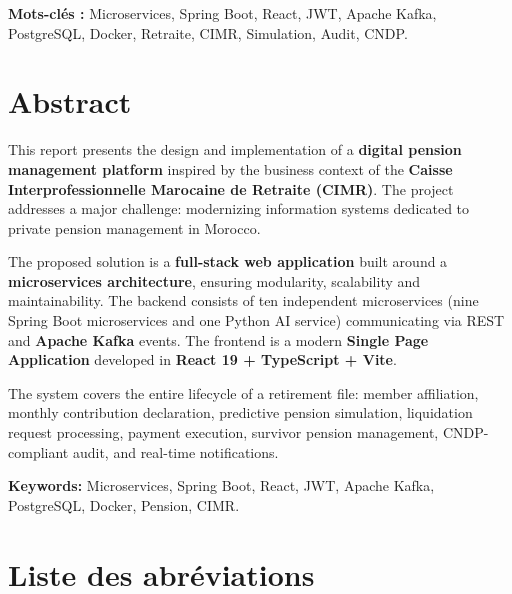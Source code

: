 \documentclass[12pt,a4paper,oneside]{report}
\begin{document}
\textbf{Mots-clés :} Microservices, Spring Boot, React, JWT, Apache Kafka, PostgreSQL, Docker, Retraite, CIMR, Simulation, Audit, CNDP.

\chapter*{Abstract}

This report presents the design and implementation of a \textbf{digital pension management platform} inspired by the business context of the \textbf{Caisse Interprofessionnelle Marocaine de Retraite (CIMR)}. The project addresses a major challenge: modernizing information systems dedicated to private pension management in Morocco.

The proposed solution is a \textbf{full-stack web application} built around a \textbf{microservices architecture}, ensuring modularity, scalability and maintainability. The backend consists of ten independent microservices (nine Spring Boot microservices and one Python AI service) communicating via REST and \textbf{Apache Kafka} events. The frontend is a modern \textbf{Single Page Application} developed in \textbf{React 19 + TypeScript + Vite}.

The system covers the entire lifecycle of a retirement file: member affiliation, monthly contribution declaration, predictive pension simulation, liquidation request processing, payment execution, survivor pension management, CNDP-compliant audit, and real-time notifications.

\textbf{Keywords:} Microservices, Spring Boot, React, JWT, Apache Kafka, PostgreSQL, Docker, Pension, CIMR.

\chapter*{Liste des abréviations}
\end{document}
